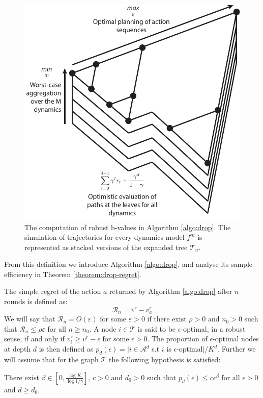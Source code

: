 \documentclass{article}
\begin{document}
\begin{figure}
\centering
\includegraphics[width=0.3\linewidth]{img/robust-control-tree}
\caption{The computation of robust b-values in Algorithm \ref{algo:drop}. The simulation of trajectories for every dynamics model $f^m$ is represented as stacked versions of the expanded tree $\mathcal{T}_n$.}
\label{fig:drop}
\end{figure}

From this definition we introduce Algorithm \ref{algo:drop}, and analyse its sample-efficiency in Theorem \ref{theorem:drop-regret}.


The simple regret of the action $a$ returned by Algorithm \ref{algo:drop} after $n$ rounds is defined as:
\begin{equation}
\mathcal{R}_n = v^r - v_a^r
\end{equation}
We will say that $\mathcal{R}_n=O(\varepsilon)$ for some $\varepsilon>0$ if there exist $\rho>0$ and $n_0>0$ such that $\mathcal{R}_n\leq\rho\varepsilon$ for all $n\geq n_0$.
A node $i\in\mathcal{T}$ is said to be $\epsilon$-optimal, in a robust sense, if and only if $v_i^r \geq v^r - \epsilon$ for some $\epsilon > 0$. The proportion of $\epsilon$-optimal nodes at depth $d$ is then defined as $p_d(\epsilon) = |i \in \mathcal{A}^d$ s.t $i$ is $\epsilon$-optimal$|/K^d$. Further we will assume that for the graph $\mathcal{T}$ the following hypothesis is satisfied:
\begin{assumption}
\label{assumpt:beta}
There exist $\beta\in[0, \frac{\log K}{\log 1/\gamma}]$, $c > 0$ and $d_0 > 0$ such that $p_d(\epsilon)\leq c\epsilon^\beta$ for all $\epsilon > 0$ and $d\geq d_0$.
\end{assumption}
\end{document}
